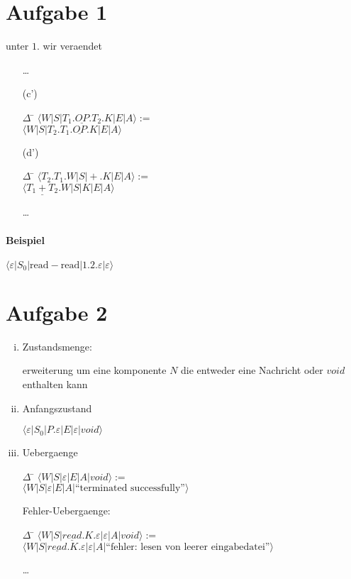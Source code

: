 



\newcommand{\op}{\underline{OP}}


\newcommand{\nr}{3}


\section*{Aufgabe 1}
unter $1.$ wir veraendet
\begin{enumerate}
\item[] \ldots
\item[(c')]
    \begin{tabbing}
    $\Delta$ \= $\langle W | S | T_1.\op.T_2.K | E | A \rangle :=$ \\
             \> $\langle W | S | T_2.T_1.\op.K | E | A \rangle$
    \end{tabbing}
\item[(d')]
    \begin{tabbing}
    $\Delta$ \= $\langle             T_2.T_1.W | S | +.K | E | A \rangle :=$ \\
             \> $\langle \underline{T_1+T_2}.W | S |   K | E | A \rangle$
    \end{tabbing}
\item[] \ldots
\end{enumerate}

\paragraph{Beispiel} $\langle \varepsilon | S_0 | \text{read} - \text{read} | 1.2.\varepsilon | \varepsilon \rangle$

\section*{Aufgabe 2}
\begin{enumerate}[(i)]
\item Zustandsmenge:

    erweiterung um eine komponente $N$ die entweder eine Nachricht oder $void$ enthalten kann
\item Anfangszustand
    
    $\langle \varepsilon | S_0 | P.\varepsilon | E | \varepsilon | void \rangle$
\item Uebergaenge
    \begin{tabbing}
    $\Delta$ \= $\langle W | S | \varepsilon | E | A | void \rangle :=$ \\
             \> $\langle W | S | \varepsilon | E | A | \text{``terminated successfully''} \rangle$
    \end{tabbing}

    Fehler-Uebergaenge:
    \begin{tabbing}
    $\Delta$ \= $\langle W | S | \underline{read}.K.\varepsilon | \varepsilon | A | void \rangle :=$ \\
             \> $\langle W | S | \underline{read}.K.\varepsilon | \varepsilon | A | 
             \text{``fehler: lesen von leerer eingabedatei''} \rangle$
    \end{tabbing}
    \ldots
\end{enumerate}

